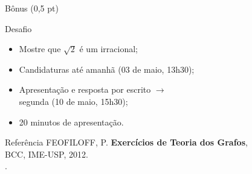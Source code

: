 \documentclass[xcolor=dvipsnames,table]{beamer}
\begin{document}
    \begin{frame}{Bônus (0,5 pt)}
		\begin{block}{Desafio}
			\begin{itemize}
				\item Mostre que $\sqrt{2}$ é um irracional; \pause
                \item Candidaturas até amanhã (03 de maio, 13h30); \pause
                \item Apresentação e resposta por escrito $\rightarrow$ \\segunda (10 de maio, 15h30); \pause
                \item 20 minutos de apresentação.
			\end{itemize}
		\end{block} \pause
        \begin{block}{Referência}
			FEOFILOFF, P. {\bf Exercícios de Teoria dos Grafos}, \\
			BCC, IME-USP, 2012. \\ 
			.
		\end{block}	
	\end{frame}
	
	\begin{frame}
		\titlepage
	\end{frame}
	
\end{document}
